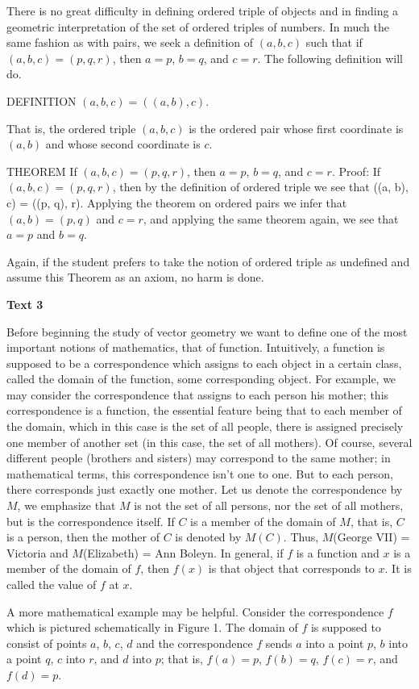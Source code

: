 \documentclass[a4paper]{article}
\newcommand{\ESect}[1]{\medskip\par{\large \textbf{#1}}\par}
\begin{document}
There is no great difficulty in defining ordered triple of objects and in finding a geometric interpretation of the set of ordered
triples of numbers. In much the same fashion as with pairs, we seek a definition of $(a, b, c)$ such that if $(a, b, c) = (p, q, r)$,
then $a = p$, $b = q$, and $c = r$. The following definition will do.

DEFINITION $(a, b, c)= ((a, b), c)$.

That is, the ordered triple $(a, b, c)$ is the ordered pair whose first coordinate is $(a,b)$ and whose second coordinate is $c$.

THEOREM If $(a, b, c) = (p, q, r)$, then $a = p$, $b = q$, and $c = r$. Proof: If $(a, b, c) = (p, q, r)$, then by the definition
of ordered triple we see that ((a, b), c) = ((p, q), r). Applying the theorem on ordered pairs we infer that $(a, b) = (p, q)$
and $c = r$, and applying the same theorem again, we see that $a = p$ and $b = q$.

Again, if the student prefers to take the notion of ordered triple as undefined and assume this Theorem as an axiom, no harm is done.

\ESect{Text 3}
Before beginning the study of vector geometry we want to define one of the most important notions of mathematics, that of
function. Intuitively, a function is supposed to be a correspondence which assigns to each object in a certain class, called the
domain of the function, some corresponding object. For example, we may consider the correspondence that assigns to each person
his mother; this correspondence is a function, the essential feature being that to each member of the domain, which in this case
is the set of all people, there is assigned precisely one member of another set (in this case, the set of all mothers). Of course,
several different people (brothers and sisters) may correspond to the same mother; in mathematical terms, this correspondence isn't
one to one. But to each person, there corresponds just exactly one mother. Let us denote the correspondence by $M$, we emphasize
that $M$ is not the set of all persons, nor the set of all mothers, but is the correspondence itself. If $C$ is a member of the
domain of $M$, that is, $C$ is a person, then the mother of $C$ is denoted by $M(C)$. Thus, $M$(George VII) = Victoria and
$M$(Elizabeth) = Ann Boleyn. In general, if $f$ is a function and $x$ is a member of the domain of $f$, then $f(x)$ is that
object that corresponds to $x$. It is called the value of $f$ at $x$.

A more mathematical example may be helpful. Consider the correspondence $f$ which is pictured schematically in Figure 1. The
domain of $f$ is supposed to consist of points $a$, $b$, $c$, $d$ and the correspondence $f$ sends $a$ into a point $p$, $b$
into a point $q$, $c$ into $r$, and $d$ into $p$; that is, $f(a) = p$, $f(b) = q$, $f(c) = r$, and $f(d) = p$.
\end{document}
